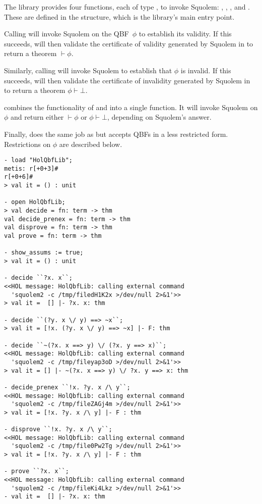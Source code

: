 The library provides four functions, each of type , to invoke
Squolem: , , , and .  These
are defined in the  structure, which is the library's main entry
point.

Calling  will invoke Squolem on the QBF~$\phi$ to
establish its validity.  If this succeeds,  will then
validate the certificate of validity generated by Squolem in \HOL{} to
return a theorem $\vdash \phi$.

Similarly, calling  will invoke Squolem to
establish that $\phi$ is invalid.  If this succeeds, 
will then validate the certificate of invalidity generated by Squolem
in \HOL{} to return a theorem $\phi \vdash \bot$.

 combines the functionality of  and
 into a single function.  It will invoke Squolem on
$\phi$ and return either $\vdash \phi$ or $\phi \vdash \bot$,
depending on Squolem's answer.

Finally,  does the same job as  but accepts QBFs
in a less restricted form. Restrictions on $\phi$ are described below.

\begin{session}
\begin{verbatim}
- load "HolQbfLib";
metis: r[+0+3]#
r[+0+6]#
> val it = () : unit

- open HolQbfLib;
> val decide = fn: term -> thm
val decide_prenex = fn: term -> thm
val disprove = fn: term -> thm
val prove = fn: term -> thm

- show_assums := true;
> val it = () : unit

- decide ``?x. x``;
<<HOL message: HolQbfLib: calling external command
  'squolem2 -c /tmp/filedH1K2x >/dev/null 2>&1'>>
> val it =  [] |- ?x. x: thm

- decide ``(?y. x \/ y) ==> ~x``;
> val it = [!x. (?y. x \/ y) ==> ~x] |- F: thm

- decide ``~(?x. x ==> y) \/ (?x. y ==> x)``;
<<HOL message: HolQbfLib: calling external command
  'squolem2 -c /tmp/fileyap3oD >/dev/null 2>&1'>>
> val it = [] |- ~(?x. x ==> y) \/ ?x. y ==> x: thm

- decide_prenex ``!x. ?y. x /\ y``;
<<HOL message: HolQbfLib: calling external command
  'squolem2 -c /tmp/fileZAGj4m >/dev/null 2>&1'>>
> val it = [!x. ?y. x /\ y] |- F : thm

- disprove ``!x. ?y. x /\ y``;
<<HOL message: HolQbfLib: calling external command
  'squolem2 -c /tmp/file0Pw2Tg >/dev/null 2>&1'>>
> val it = [!x. ?y. x /\ y] |- F : thm

- prove ``?x. x``;
<<HOL message: HolQbfLib: calling external command
  'squolem2 -c /tmp/fileKi4Lkz >/dev/null 2>&1'>>
- val it =  [] |- ?x. x: thm
\end{verbatim}
\end{session}

